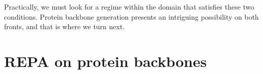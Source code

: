 \documentclass[12pt,a4paper,twoside]{report}
\begin{document}
Practically, we must look for a regime within the domain that satisfies these two conditions. Protein backbone generation presents an intriguing possibility on both fronts, and that is where we turn next.

\chapter{REPA on protein backbones}
\label{ch:proteina-study}

%
%
\end{document}

